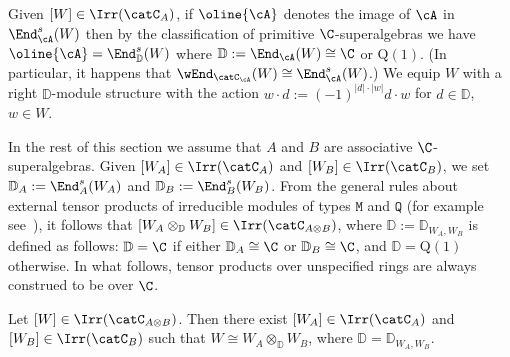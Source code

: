 \documentclass[12pt]{amsart}
\begin{document}
\begin{rmk}
\label{rmk:Abar=}Given $[W]\in\Irr(\catC_A)$,
if $\oline{\cA}$ denotes the image of $\cA$ in $\End_{\cA}^s(W)$ then by the classification of primitive $\C$-superalgebras we have $\oline{\cA}= \End_\mathbb D^s(W)$ where $\mathbb D:=\End_{\cA}(W)\cong\C$ or $\mathrm Q(1)$. (In particular, it happens that  $\wEnd_{\catC_\cA}(W)\cong\End_\cA^s(W)$.) 
We equip $W$ with a right $\mathbb D$-module structure with the action $w\cdot d:=(-1)^{|d|\cdot |w|}d\cdot w$ for $d\in\mathbb D$, $w\in W$. 
\end{rmk}

In the rest of this section we assume that  $A$ and $B$ are associative $\C$-superalgebras. Given
$[W_A]\in \Irr(\catC_A)$ and $[W_B]\in\Irr(\catC_B)$, we set
 $\mathbb D_A:=\End_{A}^s(W_A)$ and $\mathbb D_B:=\End_{B}^s(W_B)$. From the general rules about external tensor products of irreducible modules of types $\mathtt M$ and $\mathtt Q$ (for example see~\cite[Sec. 3.1.3]{ChengWang2012}), it follows that $[W_A\otimes_{\mathbb D} W_B]\in\Irr(\catC_{A\otimes B})$, where $\mathbb D:=\mathbb D_{W_A,W_B}$ is defined as follows: $\mathbb D=\C$ if 
either $\mathbb D_A\cong \C$ or $\mathbb D_B\cong \C$, and $\mathbb D=\mathrm{Q}(1)$ otherwise.  
In what follows, tensor products over unspecified rings are always construed to be over $\C$. 

\begin{prp}
\label{prp:W=WAWB}
Let $[W]\in\Irr(\catC_{A\otimes B})$. 
Then 
there exist $[W_A]\in\Irr(\catC_A)$ and $[W_B]\in\Irr(\catC_B)$  such that $W\cong W_A\otimes_\mathbb D W_B$, where $\mathbb D=\mathbb D_{W_A,W_B}$.  
\end{prp}
\end{document}
